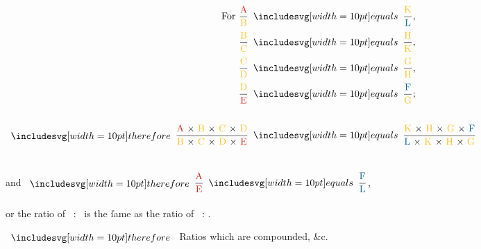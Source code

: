 \documentclass[11pt,preview]{standalone}
\begin{document}
\begin{center}
    $\begin{aligned} \text{For } \dfrac{\text{\redA}}{\text{\yellowB}}                                                                      & \bequals \dfrac{\text{\yellowK}}{\text{\blueL}},                                                                      \\[0.5ex]
                \dfrac{\text{\yellowB}}{\text{\yellowC}}                                                                               & \bequals \dfrac{\text{\yellowH}}{\text{\yellowK}},                                                                    \\[0.5ex]
                \dfrac{\text{\yellowC}}{\text{\yellowD}}                                                                               & \bequals \dfrac{\text{\yellowG}}{\text{\yellowH}},                                                                    \\[0.5ex]
                \dfrac{\text{\yellowD}}{\text{\redE}}                                                                                  & \bequals \dfrac{\text{\blueF}}{\text{\yellowG}};                                                                      \\[0.5ex]
                \hfill                                                                                                                                                                                                                                         \\
                \btherefore \dfrac{\text{\redA\ × \yellowB\ × \yellowC\ × \yellowD}}{\text{\yellowB\ × \yellowC\ × \yellowD\ × \redE}} & \bequals \dfrac{\text{\yellowK\ × \yellowH\ × \yellowG\ × \blueF}}{\text{\blueL\ × \yellowK\ × \yellowH\ × \yellowG}}\end{aligned}$\\
    \hfill\\
    \hfill\\
    and $\btherefore \dfrac{\text{\redA}}{\text{\redE}} \bequals \dfrac{\text{\blueF}}{\text{\blueL}}$,\\
    \hfill\\
    or the ratio of \redA\ : \redE\ is the ſame as the ratio of \blueF\ : \blueL.
\end{center}

\hfill

$\btherefore$ Ratios which are compounded, \&c.
\end{document}
